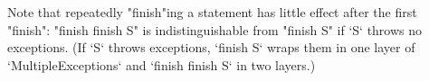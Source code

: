 Note that repeatedly \xcd"finish"ing a statement has little effect after
the first \xcd"finish": \xcd"finish finish S" is indistinguishable
from \xcd"finish S" if \xcd`S` throws no exceptions.  (If \xcd`S` throws
exceptions, \xcd`finish S` wraps them in one layer of 
\xcd`MultipleExceptions` and \xcd`finish finish S` in two layers.)

